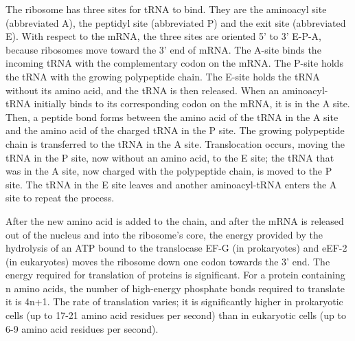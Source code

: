 The ribosome has three sites for tRNA to bind. They are the aminoacyl site (abbreviated A), the peptidyl site (abbreviated P) and the exit site (abbreviated E). With respect to the mRNA, the three sites are oriented 5' to 3' E-P-A, because ribosomes move toward the 3' end of mRNA. The A-site binds the incoming tRNA with the complementary codon on the mRNA. The P-site holds the tRNA with the growing polypeptide chain. The E-site holds the tRNA without its amino acid, and the tRNA is then released. When an aminoacyl-tRNA initially binds to its corresponding codon on the mRNA, it is in the A site. Then, a peptide bond forms between the amino acid of the tRNA in the A site and the amino acid of the charged tRNA in the P site. The growing polypeptide chain is transferred to the tRNA in the A site. Translocation occurs, moving the tRNA in the P site, now without an amino acid, to the E site; the tRNA that was in the A site, now charged with the polypeptide chain, is moved to the P site. The tRNA in the E site leaves and another aminoacyl-tRNA enters the A site to repeat the process.

After the new amino acid is added to the chain, and after the mRNA is released out of the nucleus and into the ribosome's core, the energy provided by the hydrolysis of an ATP bound to the translocase EF-G (in prokaryotes) and eEF-2 (in eukaryotes) moves the ribosome down one codon towards the 3' end. The energy required for translation of proteins is significant. For a protein containing n amino acids, the number of high-energy phosphate bonds required to translate it is 4n+1. The rate of translation varies; it is significantly higher in prokaryotic cells (up to 17-21 amino acid residues per second) than in eukaryotic cells (up to 6-9 amino acid residues per second).

